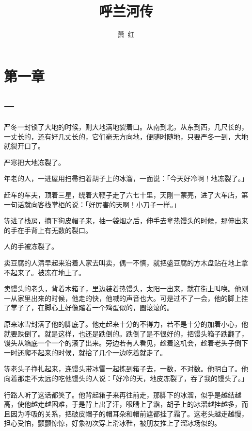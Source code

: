 \documentclass[UTF8]{ctexart}
\title{呼兰河传}
\author{萧\ 红}
\date{}
\begin{document}
\maketitle

\newpage
\tableofcontents
\newpage

\section{第一章}

\subsection{一}

严冬一封锁了大地的时候，则大地满地裂着口。从南到北，从东到西，几尺长的，一丈长的，还有好几丈长的，它们毫无方向地，便随时随地，只要严冬一到，大地就裂开口了。

严寒把大地冻裂了。

年老的人，一进屋用扫帚扫着胡子上的冰溜，一面说：「今天好冷啊！地冻裂了。」

赶车的车夫，顶着三星，绕着大鞭子走了六七十里，天刚一蒙亮，进了大车店，第一句话就向客栈掌柜的说：「好厉害的天啊！小刀子一样。」

等进了栈房，摘下狗皮帽子来，抽一袋烟之后，伸手去拿热馒头的时候，那伸出来的手在手背上有无数的裂口。

人的手被冻裂了。

卖豆腐的人清早起来沿着人家去叫卖，偶一不慎，就把盛豆腐的方木盘贴在地上拿不起来了。被冻在地上了。

卖馒头的老头，背着木箱子，里边装着热馒头，太阳一出来，就在街上叫唤。他刚一从家里出来的时候，他走的快，他喊的声音也大。可是过不了一会，他的脚上挂了掌子了，在脚心上好像踏着一个鸡蛋似的，圆滚滚的。

原来冰雪封满了他的脚底了。他走起来十分的不得力，若不是十分的加着小心，他就要跌倒了。就是这样，也还是跌倒的。跌倒了是不很好的，把馒头箱子跌翻了，馒头从箱底一个一个的滚了出来。旁边若有人看见，趁着这机会，趁着老头子倒下一时还爬不起来的时候，就拾了几个一边吃着就走了。

等老头子挣扎起来，连馒头带冰雪一起拣到箱子去，一数，不对数。他明白了。他向着那走不太远的吃他馒头的人说：「好冷的天，地皮冻裂了，吞了我的馒头了。」

行路人听了这话都笑了。他背起箱子来再往前走，那脚下的冰溜，似乎是越结越高，使他越走越困难，于是背上出了汗，眼睛上了霜，胡子上的冰溜越挂越多，而且因为呼吸的关系，把破皮帽子的帽耳朵和帽前遮都挂了霜了。这老头越走越慢，担心受怕，颤颤惊惊，好象初次穿上滑冰鞋，被朋友推上了溜冰场似的。
\end{document}
